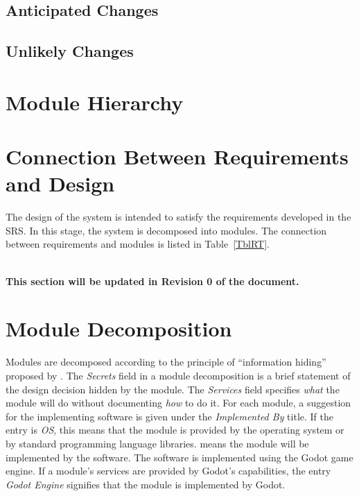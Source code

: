 \documentclass[12pt, titlepage]{article}
\begin{document}
\subsection{Anticipated Changes} \label{SecAchange}


\subsection{Unlikely Changes} \label{SecUchange}





\section{Module Hierarchy} \label{SecMH}



\section{Connection Between Requirements and Design} \label{SecConnection}

The design of the system is intended to satisfy the requirements developed in
the SRS. In this stage, the system is decomposed into modules. The connection
between requirements and modules is listed in Table~\ref{TblRT}.

\\
  
\noindent \textbf{This section will be updated in Revision 0 of the document.}

\section{Module Decomposition} \label{SecMD}

Modules are decomposed according to the principle of ``information hiding''
proposed by \citet{ParnasEtAl1984}. The \emph{Secrets} field in a module
decomposition is a brief statement of the design decision hidden by the
module. The \emph{Services} field specifies \emph{what} the module will do
without documenting \emph{how} to do it. For each module, a suggestion for the
implementing software is given under the \emph{Implemented By} title. If the
entry is \emph{OS}, this means that the module is provided by the operating
system or by standard programming language libraries.  \emph{\progname{}} means the
module will be implemented by the \progname{} software. The software is 
implemented using the Godot game engine. If a module's services are provided by 
Godot's capabilities, the entry \emph{Godot Engine} signifies that the module 
is implemented by Godot.
\end{document}
